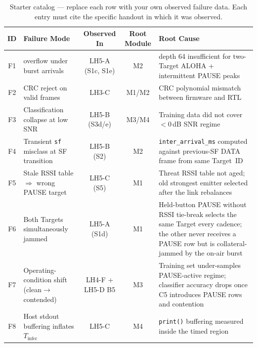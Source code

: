 \documentclass[11pt,letterpaper]{article}
\begin{document}
\begin{table}[h!]
	\centering
	\renewcommand{\arraystretch}{1.3}
	\begin{tabularx}{\textwidth}{c l c c X}
		\toprule
		\textbf{ID} & \textbf{Failure Mode} & \textbf{Observed In} & \textbf{Root Module} & \textbf{Root Cause} \\
		\midrule
		F1 & \FIFO{} overflow under burst arrivals             & LH5-A (S1c, S1e) & M2   & \FIFO{} depth 64 insufficient for two-Target ALOHA + intermittent PAUSE peaks \\
		F2 & \mbox{CRC} reject on valid frames                  & LH3-C            & M1/M2 & \mbox{CRC} polynomial mismatch between firmware and \mbox{RTL} \\
		F3 & Classification collapse at low \mbox{SNR}          & LH5-B (S3d/e)    & M3/M4 & Training data did not cover $<$0\,dB \mbox{SNR} regime \\
		F4 & Transient \texttt{sf} misclass at SF transition    & LH5-B (S2)       & M2   & \texttt{inter\_arrival\_ms} computed against previous-SF DATA frame from same Target~ID \\
		F5 & Stale RSSI table $\Rightarrow$ wrong PAUSE target  & LH5-C (S5)       & M1   & Threat RSSI table not aged; old strongest emitter selected after the link rebalances \\
		F6 & Both Targets simultaneously jammed                 & LH5-A (S1d)      & M1   & Held-button PAUSE without RSSI tie-break selects the same Target every cadence; the other never receives a PAUSE row but is collateral-jammed by the on-air burst \\
		F7 & Operating-condition shift (clean$\to$contended)    & LH4-F + LH5-D B5 & M3   & Training set under-samples PAUSE-active regime; classifier accuracy drops once C5 introduces PAUSE rows and contention \\
		F8 & Host stdout buffering inflates $T_{\text{infer}}$  & LH5-C            & M4   & \texttt{print()} buffering measured inside the timed region \\
		\bottomrule
	\end{tabularx}
	\caption{Starter catalog --- replace each row with your own observed failure data. Each entry must cite the specific handout in which it was observed.}
\end{table}
\end{document}
